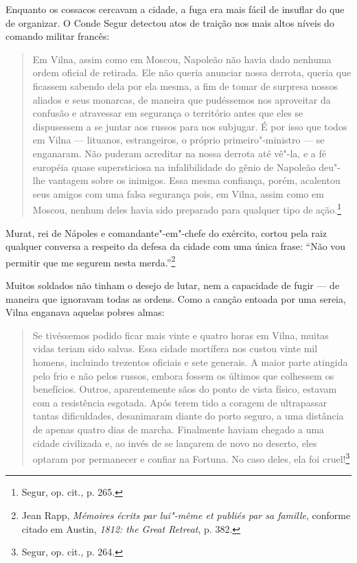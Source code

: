 Enquanto os cossacos cercavam a cidade, a fuga era mais fácil de
insuflar do que de organizar. O Conde Segur detectou atos de traição nos
mais altos níveis do comando militar francês:

\begin{quote}
Em Vilna, assim como em Moscou, Napoleão não havia dado nenhuma ordem
oficial de retirada. Ele não queria anunciar nossa derrota, queria que
ficassem sabendo dela por ela mesma, a fim de tomar de surpresa nossos
aliados e seus monarcas, de maneira que pudéssemos nos aproveitar da
confusão e atravessar em segurança o território antes que eles se
dispusessem a se juntar aos russos para nos subjugar. É por isso que
todos em Vilna --- lituanos, estrangeiros, o próprio primeiro"-ministro ---
se enganaram. Não puderam acreditar na nossa derrota até vê"-la, e a fé
européia quase supersticiosa na infalibilidade do gênio de Napoleão
deu"-lhe vantagem sobre os inimigos. Essa mesma confiança, porém,
acalentou seus amigos com uma falsa segurança pois, em Vilna, assim como
em Moscou, nenhum deles havia sido preparado para qualquer tipo de
ação.\footnote{Segur, op. cit., p. 265.}
\end{quote}

Murat, rei de Nápoles e comandante"-em"-chefe do exército, cortou pela
raiz qualquer conversa a respeito da defesa da cidade com uma única
frase: ``Não vou permitir que me segurem nesta merda.''\footnote{Jean
  Rapp, \emph{Mémoires écrits par lui"-même et publiés par sa famille},
  conforme citado em Austin, \emph{1812: the Great Retreat}, p. 382.}

Muitos soldados não tinham o desejo de lutar, nem a capacidade de fugir
--- de maneira que ignoravam todas as ordens. Como a canção entoada por
uma sereia, Vilna enganava aquelas pobres almas:

\begin{quote}
Se tivéssemos podido ficar mais vinte e quatro horas em Vilna, muitas
vidas teriam sido salvas. Essa cidade mortífera nos custou vinte mil
homens, incluindo trezentos oficiais e sete generais. A maior parte
atingida pelo frio e não pelos russos, embora fossem os últimos que
colhessem os benefícios. Outros, aparentemente sãos do ponto de vista
físico, estavam com a resistência esgotada. Após terem tido a coragem de
ultrapassar tantas dificuldades, desanimaram diante do porto seguro, a
uma distância de apenas quatro dias de marcha. Finalmente haviam chegado
a uma cidade civilizada e, ao invés de se lançarem de novo no deserto,
eles optaram por permanecer e confiar na Fortuna. No caso deles, ela foi
cruel!\footnote{Segur, op. cit., p. 264.}
\end{quote}

